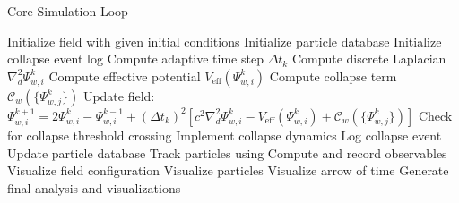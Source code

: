 \documentclass[11pt,a4paper]{article}
\begin{document}
\begin{algorithm}
\caption{Core Simulation Loop}
\label{alg:core_simulation}
\begin{algorithmic}[1]
    \State Initialize field with given initial conditions
    \State Initialize particle database
    \State Initialize collapse event log
        \State Compute adaptive time step $\Delta t_k$
                \State Compute discrete Laplacian $\nabla^2_d \Psi_{w,i}^k$
                \State Compute effective potential $V_{\text{eff}}(\Psi_{w,i}^k)$
                \State Compute collapse term $\mathcal{C}_w(\{\Psi_{w,j}^k\})$
                \State Update field: $\Psi_{w,i}^{k+1} = 2\Psi_{w,i}^k - \Psi_{w,i}^{k-1} + (\Delta t_k)^2 [c^2 \nabla^2_d \Psi_{w,i}^k - V_{\text{eff}}(\Psi_{w,i}^k) + \mathcal{C}_w(\{\Psi_{w,j}^k\})]$
            \EndFor
            \State Check for collapse threshold crossing
                \State Implement collapse dynamics
                \State Log collapse event
                \State Update particle database
            \EndIf
        \EndFor
        \State Track particles using 
        \State Compute and record observables
            \State Visualize field configuration
            \State Visualize particles
            \State Visualize arrow of time
        \EndIf
    \EndFor
    \State Generate final analysis and visualizations
\EndProcedure
\end{algorithmic}
\end{algorithm}
\end{document}
